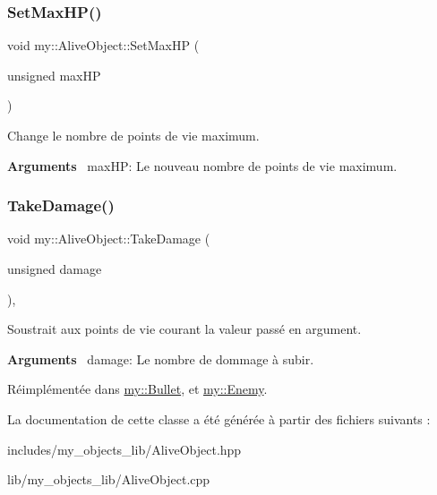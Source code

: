 \subsubsection{\texorpdfstring{Set\+Max\+H\+P()}{SetMaxHP()}}
{\footnotesize\ttfamily void my\+::\+Alive\+Object\+::\+Set\+Max\+HP (\begin{DoxyParamCaption}\item[{unsigned}]{max\+HP }\end{DoxyParamCaption})\hspace{0.3cm}{\ttfamily [noexcept]}}



Change le nombre de points de vie maximum. 

{\bfseries Arguments}~\newline
 max\+HP\+: Le nouveau nombre de points de vie maximum. \mbox{\label{classmy_1_1AliveObject_a4c13171af7b862e15bfd1737a75dab75}} 
\subsubsection{\texorpdfstring{Take\+Damage()}{TakeDamage()}}
{\footnotesize\ttfamily void my\+::\+Alive\+Object\+::\+Take\+Damage (\begin{DoxyParamCaption}\item[{unsigned}]{damage }\end{DoxyParamCaption})\hspace{0.3cm}{\ttfamily [virtual]}, {\ttfamily [noexcept]}}



Soustrait aux points de vie courant la valeur passé en argument. 

{\bfseries Arguments}~\newline
 damage\+: Le nombre de dommage à subir. 

Réimplémentée dans \hyperlink{classmy_1_1Bullet_add56b393dfba4c70de2713d4a3c917c3}{my\+::\+Bullet}, et \hyperlink{classmy_1_1Enemy_a38251585de243212ad04d5bbc2843f50}{my\+::\+Enemy}.



La documentation de cette classe a été générée à partir des fichiers suivants \+:\begin{DoxyCompactItemize}
\item 
includes/my\+\_\+objects\+\_\+lib/Alive\+Object.\+hpp\item 
lib/my\+\_\+objects\+\_\+lib/Alive\+Object.\+cpp\end{DoxyCompactItemize}
